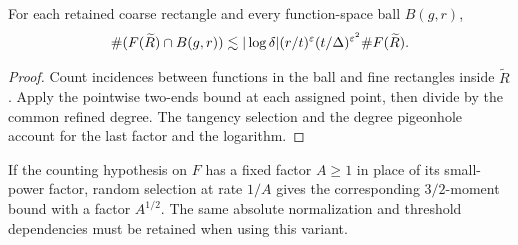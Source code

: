 \begin{lemma}
\label{lem:coarse-fibre-nonconcentration}
For each retained coarse rectangle and every function-space
ball $B(g,r)$,
\[
 \#(F(\widetilde R)\cap B(g,r))\lesssim
       |\log\delta|(r/t)^\varepsilon(t/\Delta)^{\varepsilon^2}
                                      \#F(\widetilde R).
\]
\end{lemma}
\begin{proof}
Count incidences between functions in the ball and
fine rectangles inside $\widetilde R$. Apply the
pointwise two-ends bound at each assigned point, then
divide by the common refined degree. The tangency
selection and the degree pigeonhole account for the
last factor and the logarithm.
\end{proof}

\begin{remark}
\label{rem:pyz-variable-constant}
If the counting hypothesis on $F$ has a fixed factor
$A\geq1$ in place of its small-power factor, random
selection at rate $1/A$ gives the corresponding
$3/2$-moment bound with a factor $A^{1/2}$.
The same absolute normalization and threshold
dependencies must be retained when using this variant.
\end{remark}
